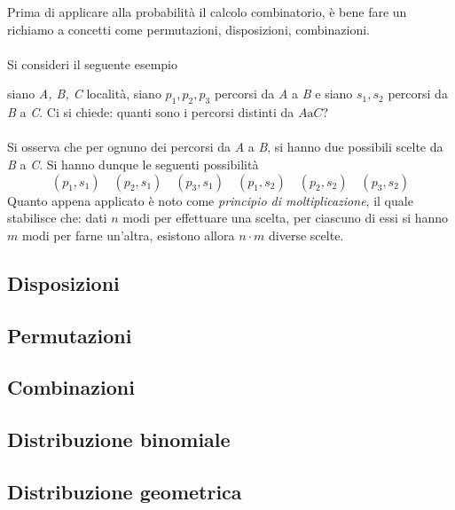 \documentclass{subfiles}
\begin{document}
Prima di applicare alla probabilità il calcolo combinatorio, è bene fare un richiamo a concetti come permutazioni, disposizioni, combinazioni.
\\ \\
Si consideri il seguente esempio
\begin{Example*}
    siano \emph{A, B, C} località, siano \(p_{1}, p_{2}, p_{3}\) percorsi da \emph{A} a \emph{B}  e siano \(s_{1}, s_{2}\) percorsi da \emph{B} a \emph{C}.
    Ci si chiede: quanti sono i percorsi distinti da \(A \text{a} C\)?
    \\ \\
    Si osserva che per ognuno dei percorsi da \emph{A} a \emph{B}, si hanno due possibili scelte da \emph{B} a \emph{C}.
    Si hanno dunque le seguenti possibilità
    \[
        (p_{1}, s_{1}) \quad (p_{2}, s_{1}) \quad (p_{3}, s_{1}) \quad (p_{1}, s_{2}) \quad (p_{2}, s_{2}) \quad (p_{3}, s_{2})
    \]
    Quanto appena applicato è noto come \emph{principio di moltiplicazione}, il quale stabilisce che:
    dati \(n\) modi per effettuare una scelta, per ciascuno di essi si hanno \(m\) modi per farne un'altra, esistono allora \(n \cdot m\) diverse scelte.
\end{Example*}

\subsection{Disposizioni}


\subsection{Permutazioni}


\subsection{Combinazioni}


\subsection{Distribuzione binomiale}


\subsection{Distribuzione geometrica}

\end{document}
